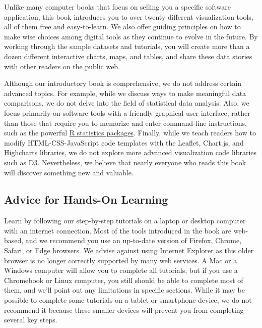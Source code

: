 \documentclass[
  english,
]{book}
\begin{document}
Unlike many computer books that focus on selling you a specific software application, this book introduces you to over twenty different visualization tools, all of them free and easy-to-learn. We also offer guiding principles on how to make wise choices among digital tools as they continue to evolve in the future. By working through the sample datasets and tutorials, you will create more than a dozen different interactive charts, maps, and tables, and share these data stories with other readers on the public web.

Although our introductory book is comprehensive, we do not address certain advanced topics. For example, while we discuss ways to make meaningful data comparisons, we do not delve into the field of statistical data analysis. Also, we focus primarily on software tools with a friendly graphical user interface, rather than those that require you to memorize and enter command-line instructions, such as the powerful \href{https://www.r-project.org}{R statistics packages}. Finally, while we teach readers how to modify HTML-CSS-JavaScript code templates with the Leaflet, Chart.js, and Highcharts libraries, we do not explore more advanced visualization code libraries such as \href{https://d3js.org}{D3}. Nevertheless, we believe that nearly everyone who reads this book will discover something new and valuable.

\hypertarget{advice-for-hands-on-learning}{%
\subsection*{Advice for Hands-On Learning}\label{advice-for-hands-on-learning}}

Learn by following our step-by-step tutorials on a laptop or desktop computer with an internet connection. Most of the tools introduced in the book are web-based, and we recommend you use an up-to-date version of Firefox, Chrome, Safari, or Edge browsers. We advise against using Internet Explorer as this older browser is no longer correctly supported by many web services. A Mac or a Windows computer will allow you to complete all tutorials, but if you use a Chromebook or Linux computer, you still should be able to complete most of them, and we'll point out any limitations in specific sections. While it may be possible to complete some tutorials on a tablet or smartphone device, we do not recommend it because these smaller devices will prevent you from completing several key steps.
\end{document}
